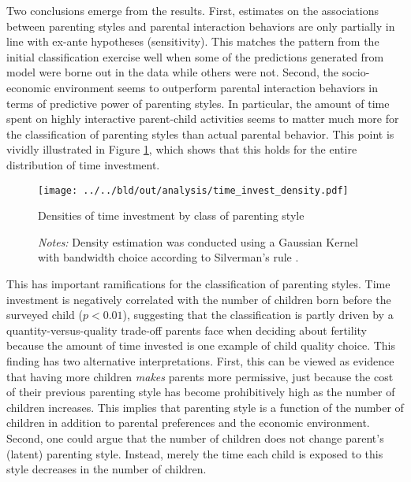 Two conclusions emerge from the results. First, estimates on the associations between parenting styles and parental interaction behaviors are only partially in line with ex-ante hypotheses (sensitivity). This matches the pattern from the initial classification exercise well when some of the predictions generated from model were borne out in the data while others were not. Second, the socio-economic environment seems to outperform parental interaction behaviors in terms of predictive power of parenting styles. In particular, the amount of time spent on highly interactive parent-child activities seems to matter much more for the classification of parenting styles than actual parental behavior. This point is vividly illustrated in Figure \ref{fig:density}, which shows that this holds for the entire distribution of time investment.

\begin{figure}[htb]
	\centering
	\texttt{[image: ../../bld/out/analysis/time\_invest\_density.pdf]}
	\caption{Densities of time investment by class of parenting style}
	\vspace{-0.25cm}
	\caption*{\footnotesize \textit{Notes:} Density estimation was conducted using a Gaussian Kernel with bandwidth choice according to Silverman's rule \parencite{silvermanDensityEstimationStatistics1998}.}  
	\label{fig:density}  
\end{figure} 

This has important ramifications for the classification of parenting styles. Time investment is negatively correlated with the number of children born before the surveyed child ($p < 0.01$), suggesting that the classification is partly driven by a quantity-versus-quality trade-off parents face when deciding about fertility \parencite{beckerTreatiseFamily1981} because the amount of time invested is one example of child quality choice. This finding has two alternative interpretations. First, this can be viewed as evidence that having more children \textit{makes} parents more permissive, just because the cost of their previous parenting style has become prohibitively high as the number of children increases. This implies that parenting style is a function of the number of children in addition to parental preferences and the economic environment. Second, one could argue that the number of children does not change parent's (latent) parenting style. Instead, merely the time each child is exposed to this style decreases in the number of children.

